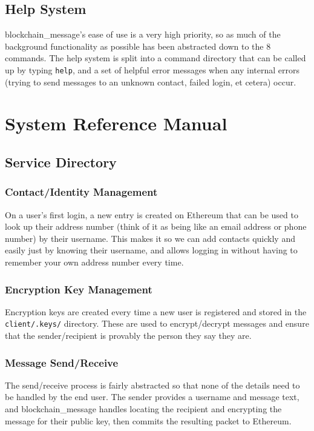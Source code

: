 \documentclass[titlepage]{report}
\begin{document}
\subsection{Help System}
blockchain\_message's ease of use is a very high priority, so as much of the background functionality as possible has been abstracted down to the 8 commands. The help system is split into a command directory that can be called up by typing \texttt{help}, and a set of helpful error messages when any internal errors (trying to send messages to an unknown contact, failed login, et cetera) occur.

\section{System Reference Manual}
\subsection{Service Directory}

\subsubsection{Contact/Identity Management}
On a user's first login, a new entry is created on \gls{Ethereum} that can be used to look up their address number (think of it as being like an email address or phone number) by their username. This makes it so we can add contacts quickly and easily just by knowing their username, and allows logging in without having to remember your own address number every time.
\subsubsection{Encryption Key Management}
Encryption keys are created every time a new user is registered and stored in the \texttt{client/.keys/} directory. These are used to encrypt/decrypt messages and ensure that the sender/recipient is provably the person they say they are.
\subsubsection{Message Send/Receive}
The send/receive process is fairly abstracted so that none of the details need to be handled by the end user. The sender provides a username and message text, and blockchain\_message handles locating the recipient and encrypting the message for their \gls{public key}, then commits the resulting packet to \gls{Ethereum}.
\end{document}
